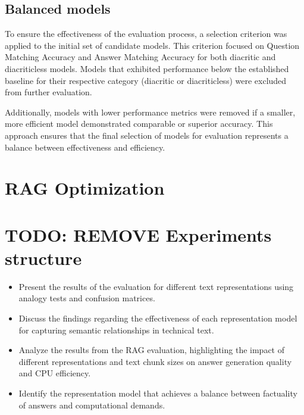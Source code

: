 \FloatBarrier



\FloatBarrier

\subsection{Balanced models}
To ensure the effectiveness of the evaluation process, a selection criterion was applied to the initial set of candidate models.
This criterion focused on Question Matching Accuracy and Answer Matching Accuracy for both diacritic and diacriticless models.
Models that exhibited performance below the established baseline for their respective category (diacritic or diacriticless) were excluded from further evaluation.

Additionally, models with lower performance metrics were removed if a smaller, more efficient model demonstrated comparable or superior accuracy.
This approach ensures that the final selection of models for evaluation represents a balance between effectiveness and efficiency.



\section{RAG Optimization}



\section{TODO: REMOVE Experiments structure}
\begin{itemize}
    \item Present the results of the evaluation for different text representations using analogy tests and confusion matrices.
    \item Discuss the findings regarding the effectiveness of each representation model for capturing semantic relationships in technical text.
    \item Analyze the results from the RAG evaluation, highlighting the impact of different representations and text chunk sizes on answer generation quality and CPU efficiency.
    \item Identify the representation model that achieves a balance between factuality of answers and computational demands.
\end{itemize}
